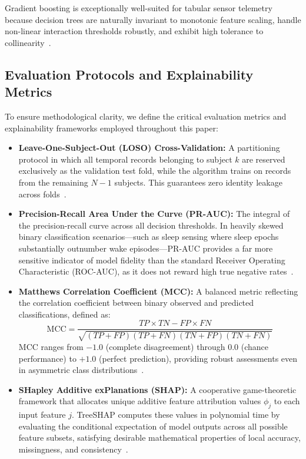 \documentclass[journal,11pt,onecolumn]{IEEEtran}
\begin{document}
Gradient boosting is exceptionally well-suited for tabular sensor telemetry because decision trees are naturally invariant to monotonic feature scaling, handle non-linear interaction thresholds robustly, and exhibit high tolerance to collinearity~\cite{friedman2001greedy, chen2016xgboost}.

\subsection{Evaluation Protocols and Explainability Metrics}
To ensure methodological clarity, we define the critical evaluation metrics and explainability frameworks employed throughout this paper:
\begin{itemize}[leftmargin=*]
    \item \textbf{Leave-One-Subject-Out (LOSO) Cross-Validation:} A partitioning protocol in which all temporal records belonging to subject $k$ are reserved exclusively as the validation test fold, while the algorithm trains on records from the remaining $N-1$ subjects. This guarantees zero identity leakage across folds~\cite{saeb2017need}.
    \item \textbf{Precision-Recall Area Under the Curve (PR-AUC):} The integral of the precision-recall curve across all decision thresholds. In heavily skewed binary classification scenarios---such as sleep sensing where sleep epochs substantially outnumber wake episodes---PR-AUC provides a far more sensitive indicator of model fidelity than the standard Receiver Operating Characteristic (ROC-AUC), as it does not reward high true negative rates~\cite{saito2015precision}.
    \item \textbf{Matthews Correlation Coefficient (MCC):} A balanced metric reflecting the correlation coefficient between binary observed and predicted classifications, defined as:
    \begin{equation}
    \text{MCC} = \frac{TP \times TN - FP \times FN}{\sqrt{(TP + FP)(TP + FN)(TN + FP)(TN + FN)}}
    \end{equation}
    MCC ranges from $-1.0$ (complete disagreement) through $0.0$ (chance performance) to $+1.0$ (perfect prediction), providing robust assessments even in asymmetric class distributions~\cite{chicco2020advantages}.
    \item \textbf{SHapley Additive exPlanations (SHAP):} A cooperative game-theoretic framework that allocates unique additive feature attribution values $\phi_j$ to each input feature $j$. TreeSHAP computes these values in polynomial time by evaluating the conditional expectation of model outputs across all possible feature subsets, satisfying desirable mathematical properties of local accuracy, missingness, and consistency~\cite{lundberg2017unified}.
\end{itemize}
\end{document}
